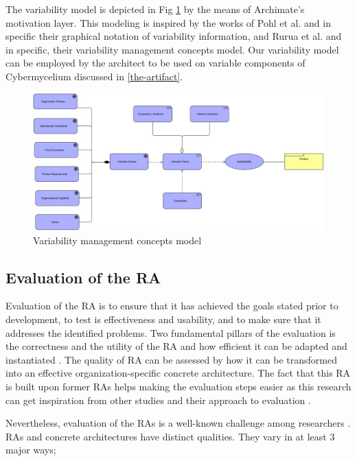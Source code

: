 \documentclass[review]{elsarticle}
\begin{document}
The variability model is depicted in Fig \ref{variability} by the means of Archimate's motivation layer. This modeling is inspired by the works of Pohl et al. \cite{pohl2005software} and in specific their graphical notation of variability information, and Rurua et al. \cite{rurua2019representing} and in specific, their variability management concepts model. Our variability model can be employed by the architect to be used on variable components of Cybermycelium discussed in \ref{the-artifact}.

\begin{figure}[h!]
    \centering
    \includegraphics[width=13cm]{variability-model.JPG}
    \caption{Variability management concepts model}
    \label{variability}
\end{figure}

\subsection{Evaluation of the RA}

Evaluation of the RA is to ensure that it has achieved the goals stated prior to development, to test is effectiveness and usability, and to make sure that it addresses the identified problems. Two fundamental pillars of the evaluation is the correctness and the utility of the RA and how efficient it can be adapted and instantiated \cite{galster2011empirically}. The quality of RA can be assessed by how it can be transformed into an effective organization-specific concrete architecture. The fact that this RA is built upon former RAs helps making the evaluation steps easier as this research can get inspiration from other studies and their approach to evaluation \cite{sharpe2019industrial}.

Nevertheless, evaluation of the RAs is a well-known challenge among researchers \cite{angelov2008contracting,Avgeriou,Cioroaica,Maier}. RAs and concrete architectures have distinct qualities. They vary in at least 3 major ways;
\end{document}
